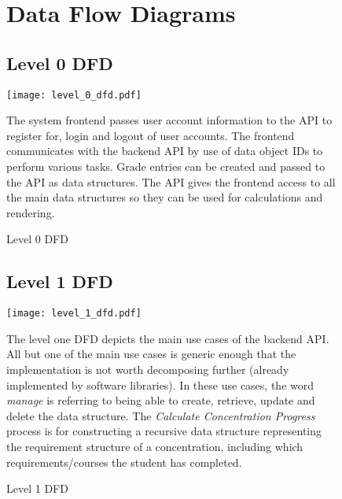 \documentclass[12pt]{article}
\begin{document}
\begin{figure}[p!]
  \section{Data Flow Diagrams}
  \subsection{Level 0 DFD}
  \centering
  \texttt{[image: level\_0\_dfd.pdf]}
  \caption{Level 0 DFD}
  \begin{flushleft}
    The system frontend passes user account information to the API to register for, login and logout
    of user accounts. The frontend communicates with the backend API by use of data object IDs to
    perform various tasks. Grade entries can be created and passed to the API as data structures.
    The API gives the frontend access to all the main data structures so they can be used for
    calculations and rendering.
  \end{flushleft}
\end{figure}

\begin{figure}[p!]
  \subsection{Level 1 DFD}
  \centering
  \texttt{[image: level\_1\_dfd.pdf]}
  \caption{Level 1 DFD}
  \begin{flushleft}
    The level one DFD depicts the main use cases of the backend API. All but one of the main use
    cases is generic enough that the implementation is not worth decomposing further (already
    implemented by software libraries). In these use cases, the word \emph{manage} is referring to
    being able to create, retrieve, update and delete the data structure. The \emph{Calculate
    Concentration Progress} process is for constructing a recursive data structure representing the
    requirement structure of a concentration, including which requirements/courses the student has
    completed.
  \end{flushleft}
\end{figure}
\end{document}
